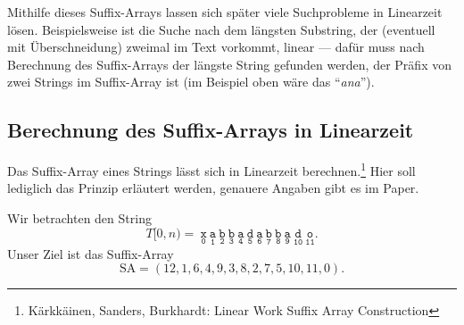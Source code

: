 Mithilfe dieses Suffix-Arrays lassen sich später viele Suchprobleme in Linearzeit lösen. Beispielsweise ist die Suche nach dem längsten Substring, der (eventuell mit Überschneidung) zweimal im Text vorkommt, linear --- dafür muss nach Berechnung des Suffix-Arrays der längste String gefunden werden, der Präfix von zwei Strings im Suffix-Array ist (im Beispiel oben wäre das ``\emph{ana}'').

\subsection{Berechnung des Suffix-Arrays in Linearzeit}

Das Suffix-Array eines Strings lässt sich in Linearzeit berechnen.\footnote{Kärkkäinen, Sanders, Burkhardt: Linear Work Suffix Array Construction} Hier soll lediglich das Prinzip erläutert werden, genauere Angaben gibt es im Paper.

Wir betrachten den String
\begin{equation*}
  T[0,n) = \ \underset{\texttt{0}}{\texttt{x}}\ \underset{\texttt{1}}{\texttt{a}}\ \underset{\texttt{2}}{\texttt{b}}\ \underset{\texttt{3}}{\texttt{b}}\ \underset{\texttt{4}}{\texttt{a}}\ \underset{\texttt{5}}{\texttt{d}}\ \underset{\texttt{6}}{\texttt{a}}\ \underset{\texttt{7}}{\texttt{b}}\ \underset{\texttt{8}}{\texttt{b}}\ \underset{\texttt{9}}{\texttt{a}}\ \underset{\texttt{10}}{\texttt{d}}\ \underset{\texttt{11}}{\texttt{o}}\text{.}
\end{equation*}
Unser Ziel ist das Suffix-Array
\begin{equation*}
  \text{SA} = \left( 12,1,6,4,9,3,8,2,7,5,10,11,0 \right)\text{.}
\end{equation*}

